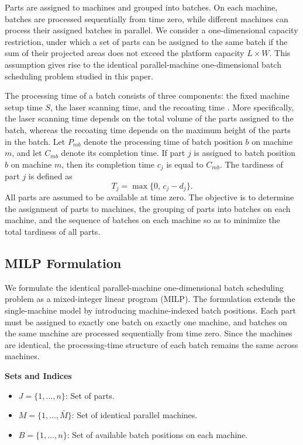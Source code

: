 \documentclass[review,3p,times,authoryear]{elsarticle}
\begin{document}
Parts are assigned to machines and grouped into batches. On each machine,
batches are processed sequentially from time zero, while different machines
can process their assigned batches in parallel. We consider a
one-dimensional capacity restriction, under which a set of parts can be
assigned to the same batch if the sum of their projected areas does not
exceed the platform capacity $L \times W$. This assumption gives rise to the
identical parallel-machine one-dimensional batch scheduling problem studied
in this paper.

The processing time of a batch consists of three components: the fixed
machine setup time $S$, the laser scanning time, and the recoating time
\cite{cheMachineSchedulingOrientation2021}. More specifically, the laser
scanning time depends on the total volume of the parts assigned to the
batch, whereas the recoating time depends on the maximum height of the parts
in the batch. Let $P_{mb}$ denote the processing time of batch position $b$
on machine $m$, and let $C_{mb}$ denote its completion time. If part $j$ is
assigned to batch position $b$ on machine $m$, then its completion time
$c_j$ is equal to $C_{mb}$. The tardiness of part $j$ is defined as
\[
T_j=\max\{0,\,c_j-d_j\}.
\]
All parts are assumed to be available at time zero. The objective is to
determine the assignment of parts to machines, the grouping of parts into
batches on each machine, and the sequence of batches on each machine so as
to minimize the total tardiness of all parts.

\subsection{MILP Formulation}
We formulate the identical parallel-machine one-dimensional batch scheduling problem as a mixed-integer linear program (MILP). The formulation extends the single-machine model by introducing machine-indexed batch positions. Each part must be assigned to exactly one batch on exactly one machine, and batches on the same machine are processed sequentially from time zero. Since the machines are identical, the processing-time structure of each batch remains the same across machines.

\noindent \textbf{Sets and Indices}
\begin{itemize}
	\item $J = \{1, \dots, n\}$: Set of parts.
	\item $M = \{1, \dots, \bar M\}$: Set of identical parallel machines.
	\item $B = \{1, \dots, n\}$: Set of available batch positions on each machine.
\end{itemize}
\end{document}
